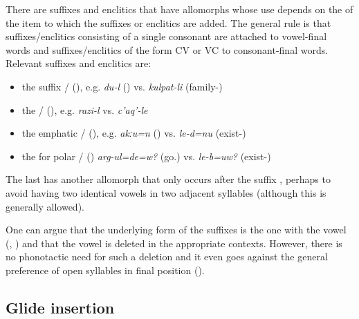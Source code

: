 There are suffixes and enclitics that have allomorphs whose use depends on the  of the item to which the suffixes or enclitics are added. The general rule is that suffixes\slash enclitics consisting of a single consonant are attached to vowel-final words and suffixes\slash enclitics of the form CV or VC to consonant-final words. Relevant suffixes and enclitics are:
%
\begin{itemize}
	\item	the  suffix \slash{} (), e.g. \textit{du-l} () vs. \textit{kulpat-li} (family-)
	\item	the  \slash{} (), e.g. \textit{razi-l}  vs. \textit{c'aq'-le} 
	\item	the emphatic  \slash{} (), e.g. \textit{akːu=n} () vs. \textit{le-d=nu} (exist-)
	\item	the  for polar  \slash{} () \textit{arg-ul=de=w?} (go.)  vs. \textit{le-b=uw?} (exist-) 
\end{itemize}

The last  has another allomorph  that only occurs after the  suffix , perhaps to avoid having two identical vowels in two adjacent syllables (although this is generally allowed).

One can argue that the underlying form of the suffixes is the one with the vowel \linebreak (, ) and that the vowel is deleted in the appropriate contexts. However, there is no phonotactic need for such a deletion and it even goes against the general preference of open syllables in final position ().



\subsection{Glide insertion}
\label{ssec:Glide insertion}

